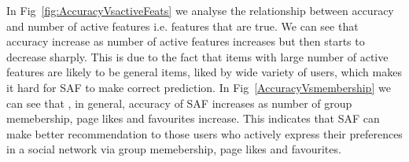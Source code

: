 In Fig~\ref{fig:AccuracyVsactiveFeats} we analyse the relationship
between accuracy and number of active features i.e. features that are
true. We can see that accuracy increase as number of active features
increases but then starts to decrease sharply. This is due to the fact
that items with large number of active features are likely to be
general items, liked by wide variety of users, which makes it hard for
SAF to make correct prediction. In Fig~\ref{AccuracyVsmembership} we
can see that , in general, accuracy of SAF increases as number of
group memebership, page likes and favourites increase.  This indicates
that SAF can make better recommendation to those users who actively
express their preferences in a social network via group memebership,
page likes and favourites.
    

%


